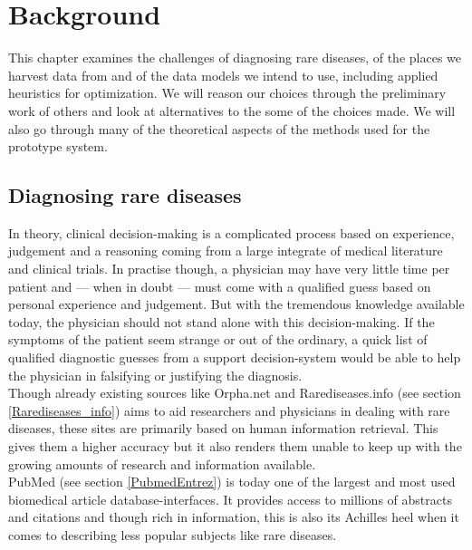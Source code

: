 \chapter{Background\label{Background}}

This chapter examines the challenges of diagnosing
rare diseases, of the places we harvest data from and of the data
models we intend to use, including applied heuristics for
optimization. We will reason our choices through the preliminary work
of others and look at alternatives to the some of the choices made. We
will also go through many of the theoretical aspects of the methods
used for the prototype system.\\

\section{Diagnosing rare diseases}

In theory, clinical decision-making is a complicated process based on
experience, judgement and a reasoning coming from a large integrate of
medical literature and clinical trials. In practise though, a
physician may have very little time per patient and --- when in doubt ---
must come with a qualified guess based on personal experience and
judgement. But with the tremendous knowledge available today, the
physician should not stand alone with this decision-making. If the
symptoms of the patient seem strange or out of the ordinary, a quick
list of qualified diagnostic guesses from a support decision-system
would be able to help the physician in falsifying or justifying the
diagnosis.\\

Though already existing sources like Orpha.net and
Rarediseases.info (see section \ref{Rarediseases_info}) aims to aid researchers and
physicians in dealing with rare diseases, these sites are primarily
based on human information retrieval. This gives them a higher
accuracy but it also renders them unable to keep up with the growing
amounts of research and information available.\\

PubMed (see section \ref{PubmedEntrez}) is today one of the largest and most used
biomedical article database-interfaces. It provides access to millions
of abstracts and citations and though rich in information, this is
also its Achilles heel when it comes to describing less popular
subjects like rare diseases.\\

